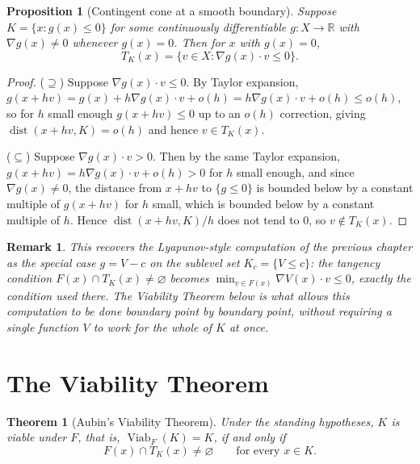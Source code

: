 \documentclass[11pt]{report}
\newtheorem{proposition}{Proposition}[chapter]
\newtheorem{theorem}{Theorem}[chapter]
\newtheorem{remark}{Remark}[chapter]
\begin{document}
\begin{proposition}[Contingent cone at a smooth boundary]
Suppose $K = \{x : g(x) \leq 0\}$ for some continuously differentiable
$g : X \to \mathbb{R}$ with $\nabla g(x) \neq 0$ whenever $g(x) = 0$.
Then for $x$ with $g(x) = 0$,
\[
T_K(x) = \{v \in X : \nabla g(x) \cdot v \leq 0\}.
\]
\end{proposition}
\begin{proof}
($\supseteq$) Suppose $\nabla g(x) \cdot v \leq 0$. By Taylor expansion,
$g(x + hv) = g(x) + h \nabla g(x) \cdot v + o(h) = h \nabla g(x) \cdot v + o(h) \leq o(h)$,
so for $h$ small enough $g(x+hv) \leq 0$ up to an $o(h)$ correction,
giving $\operatorname{dist}(x+hv, K) = o(h)$ and hence $v \in T_K(x)$.

($\subseteq$) Suppose $\nabla g(x) \cdot v > 0$. Then by the same Taylor
expansion, $g(x+hv) = h\nabla g(x)\cdot v + o(h) > 0$ for $h$ small
enough, and since $\nabla g(x) \neq 0$, the distance from $x+hv$ to
$\{g \leq 0\}$ is bounded below by a constant multiple of
$g(x+hv)$ for $h$ small, which is bounded below by a constant multiple
of $h$. Hence $\operatorname{dist}(x+hv,K)/h$ does not tend to $0$, so
$v \notin T_K(x)$.
\end{proof}

\begin{remark}
This recovers the Lyapunov-style computation of the previous chapter as
the special case $g = V - c$ on the sublevel set $K_c = \{V \leq c\}$:
the tangency condition $F(x) \cap T_K(x) \neq \varnothing$ becomes
$\min_{v \in F(x)} \nabla V(x) \cdot v \leq 0$, exactly the condition
used there. The Viability Theorem below is what allows this
computation to be done boundary point by boundary point, without
requiring a single function $V$ to work for the whole of $K$ at once.
\end{remark}

\section*{The Viability Theorem}

\begin{theorem}[Aubin's Viability Theorem]
Under the standing hypotheses, $K$ is viable under $F$, that is,
$\operatorname{Viab}_F(K) = K$, if and only if
\[
F(x) \cap T_K(x) \neq \varnothing \qquad \text{for every } x \in K.
\]
\end{theorem}
\end{document}
